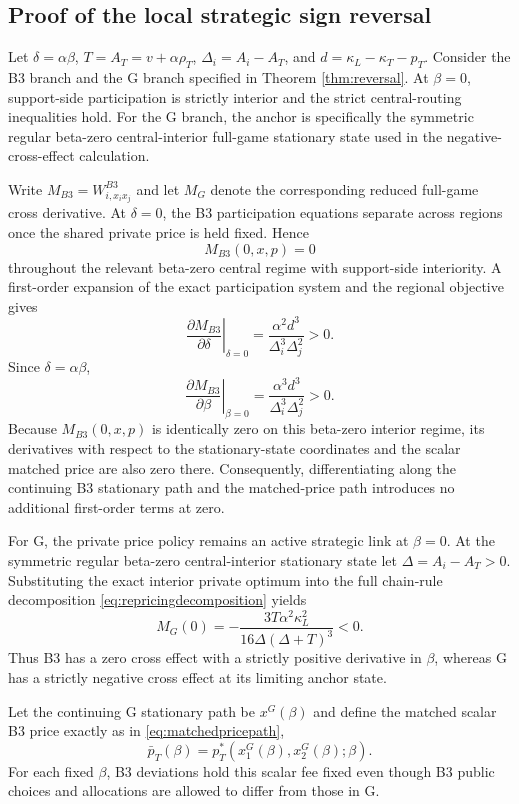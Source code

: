 \subsection{Proof of the local strategic sign reversal}\label{app:smallbeta}
Let $\delta=\alpha\beta$, $T=A_T=v+\alpha\rho_T$, $\Delta_i=A_i-A_T$, and $d=\kappa_L-\kappa_T-p_T$. Consider the B3 branch and the G branch specified in Theorem \ref{thm:reversal}. At $\beta=0$, support-side participation is strictly interior and the strict central-routing inequalities hold. For the G branch, the anchor is specifically the symmetric regular beta-zero central-interior full-game stationary state used in the negative-cross-effect calculation.

Write $M_{B3}=W_{i,x_ix_j}^{B3}$ and let $M_G$ denote the corresponding reduced full-game cross derivative. At $\delta=0$, the B3 participation equations separate across regions once the shared private price is held fixed. Hence
\[
M_{B3}(0,x,p)=0
\]
throughout the relevant beta-zero central regime with support-side interiority. A first-order expansion of the exact participation system and the regional objective gives
\[
\left.\frac{\partial M_{B3}}{\partial\delta}\right|_{\delta=0}
=\frac{\alpha^2d^3}{\Delta_i^3\Delta_j^2}>0.
\]
Since $\delta=\alpha\beta$,
\[
\left.\frac{\partial M_{B3}}{\partial\beta}\right|_{\beta=0}
=\frac{\alpha^3d^3}{\Delta_i^3\Delta_j^2}>0.
\]
Because $M_{B3}(0,x,p)$ is identically zero on this beta-zero interior regime, its derivatives with respect to the stationary-state coordinates and the scalar matched price are also zero there. Consequently, differentiating along the continuing B3 stationary path and the matched-price path introduces no additional first-order terms at zero.

For G, the private price policy remains an active strategic link at $\beta=0$. At the symmetric regular beta-zero central-interior stationary state let $\Delta=A_i-A_T>0$. Substituting the exact interior private optimum into the full chain-rule decomposition \eqref{eq:repricingdecomposition} yields
\[
M_G(0)
=-\frac{3T\alpha^2\kappa_L^2}{16\Delta(\Delta+T)^3}<0.
\]
Thus B3 has a zero cross effect with a strictly positive derivative in $\beta$, whereas G has a strictly negative cross effect at its limiting anchor state.

Let the continuing G stationary path be $x^G(\beta)$ and define the matched scalar B3 price exactly as in \eqref{eq:matchedpricepath},
\[
\bar p_T(\beta)=p_T^*\!\left(x_1^G(\beta),x_2^G(\beta);\beta\right).
\]
For each fixed $\beta$, B3 deviations hold this scalar fee fixed even though B3 public choices and allocations are allowed to differ from those in G.

